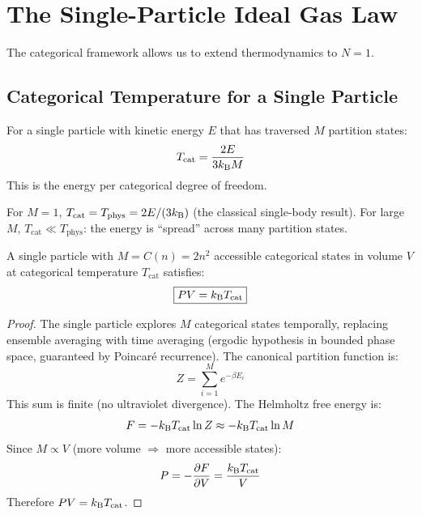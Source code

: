 \section{The Single-Particle Ideal Gas Law}
\label{sec:single_particle}

The categorical framework allows us to extend thermodynamics to $N = 1$.

\subsection{Categorical Temperature for a Single Particle}

\begin{definition}
\label{def:cat_temp}
For a single particle with kinetic energy $E$ that has traversed $M$ partition states:
\begin{equation}
    T_{\mathrm{cat}} = \frac{2E}{3k_{\mathrm{B}} M}
\end{equation}
This is the energy per categorical degree of freedom.
\end{definition}

\begin{remark}
For $M = 1$, $T_{\mathrm{cat}} = T_{\mathrm{phys}} = 2E/(3k_{\mathrm{B}})$ (the classical single-body result). For large $M$, $T_{\mathrm{cat}} \ll T_{\mathrm{phys}}$: the energy is ``spread'' across many partition states.
\end{remark}

\begin{theorem}
\label{thm:single_gas}
A single particle with $M = C(n) = 2n^2$ accessible categorical states in volume $V$ at categorical temperature $T_{\mathrm{cat}}$ satisfies:
\begin{equation}
\boxed{PV = k_{\mathrm{B}} T_{\mathrm{cat}}}
\end{equation}
\end{theorem}

\begin{proof}
The single particle explores $M$ categorical states temporally, replacing ensemble averaging with time averaging (ergodic hypothesis in bounded phase space, guaranteed by Poincar\'{e} recurrence). The canonical partition function is:
\begin{equation}
    Z = \sum_{i=1}^{M} e^{-\beta E_i}
\end{equation}
This sum is finite (no ultraviolet divergence). The Helmholtz free energy is:
\begin{equation}
    F = -k_{\mathrm{B}} T_{\mathrm{cat}} \ln Z \approx -k_{\mathrm{B}} T_{\mathrm{cat}} \ln M
\end{equation}
Since $M \propto V$ (more volume $\Rightarrow$ more accessible states):
\begin{equation}
    P = -\frac{\partial F}{\partial V} = \frac{k_{\mathrm{B}} T_{\mathrm{cat}}}{V}
\end{equation}
Therefore $PV = k_{\mathrm{B}} T_{\mathrm{cat}}$.
\end{proof}

